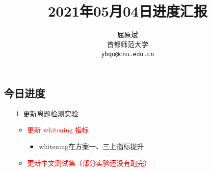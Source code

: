 \documentclass[11pt]{article}
\title{2021年05月04日进度汇报}
\author{屈原斌 \\
首都师范大学 \\
{\tt ybqu@cnu.edu.cn}}
\date{}
\begin{document}
\begin{CJK}{UTF8}{gkai}
\tableofcontents
  
\maketitle
\CJKindent


\section{今日进度}


\begin{itemize}
  \item [1.] 更新离题检测实验
  \begin{itemize}
    \item \textcolor{red}{更新 whitening 指标}
    \begin{itemize}
      \item whitening在方案一、三上指标提升
    \end{itemize}
    \item \textcolor{red}{更新中文测试集（部分实验还没有跑完）}
  \end{itemize}
\end{itemize}


\end{CJK}
\end{document}
